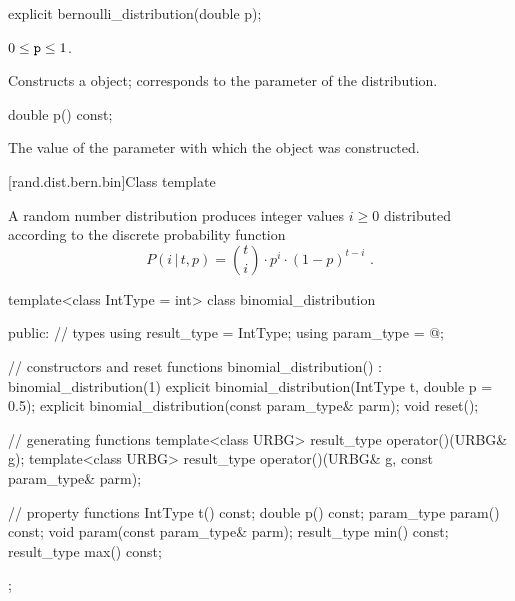 %
\begin{itemdecl}
explicit bernoulli_distribution(double p);
\end{itemdecl}

\begin{itemdescr}
\pnum\requires
 $0 \leq \texttt{p} \leq 1$.

\pnum\effects Constructs a  object;
 corresponds to the parameter of the distribution.
\end{itemdescr}

%
\begin{itemdecl}
double p() const;
\end{itemdecl}

\begin{itemdescr}
\pnum\returns The value of the  parameter
 with which the object was constructed.
\end{itemdescr}


[rand.dist.bern.bin]{Class template }%
%
%

\pnum
A  random number distribution
produces integer values $i \geq 0$
distributed according to
the discrete probability function%
%
%
\[ P(i\,|\,t,p) = \binom{t}{i} \cdot p^i \cdot (1-p)^{t-i} \text{ .} \]

%
\begin{codeblock}
template<class IntType = int>
  class binomial_distribution {
  public:
    // types
    using result_type = IntType;
    using param_type  = @\unspec@;

    // constructors and reset functions
    binomial_distribution() : binomial_distribution(1) {}
    explicit binomial_distribution(IntType t, double p = 0.5);
    explicit binomial_distribution(const param_type& parm);
    void reset();

    // generating functions
    template<class URBG>
      result_type operator()(URBG& g);
    template<class URBG>
      result_type operator()(URBG& g, const param_type& parm);

    // property functions
    IntType t() const;
    double p() const;
    param_type param() const;
    void param(const param_type& parm);
    result_type min() const;
    result_type max() const;
  };
\end{codeblock}


